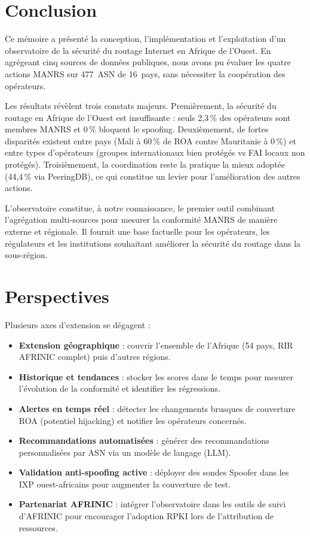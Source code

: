 \documentclass{eneam}
\begin{document}
\section{Conclusion}

Ce mémoire a présenté la conception, l'implémentation et l'exploitation d'un observatoire de la sécurité du routage Internet en Afrique de l'Ouest. En agrégeant cinq sources de données publiques, nous avons pu évaluer les quatre actions MANRS sur 477~ASN de 16~pays, sans nécessiter la coopération des opérateurs.

Les résultats révèlent trois constats majeurs. Premièrement, la sécurité du routage en Afrique de l'Ouest est insuffisante : seuls 2,3\,\% des opérateurs sont membres MANRS et 0\,\% bloquent le spoofing. Deuxièmement, de fortes disparités existent entre pays (Mali à 60\,\% de ROA contre Mauritanie à 0\,\%) et entre types d'opérateurs (groupes internationaux bien protégés vs FAI locaux non protégés). Troisièmement, la coordination reste la pratique la mieux adoptée (44,4\,\% via PeeringDB), ce qui constitue un levier pour l'amélioration des autres actions.

L'observatoire constitue, à notre connaissance, le premier outil combinant l'agrégation multi-sources pour mesurer la conformité MANRS de manière externe et régionale. Il fournit une base factuelle pour les opérateurs, les régulateurs et les institutions souhaitant améliorer la sécurité du routage dans la sous-région.

\section{Perspectives}

Plusieurs axes d'extension se dégagent :

\begin{itemize}
    \item \textbf{Extension géographique} : couvrir l'ensemble de l'Afrique (54 pays, RIR AFRINIC complet) puis d'autres régions.
    \item \textbf{Historique et tendances} : stocker les scores dans le temps pour mesurer l'évolution de la conformité et identifier les régressions.
    \item \textbf{Alertes en temps réel} : détecter les changements brusques de couverture ROA (potentiel hijacking) et notifier les opérateurs concernés.
    \item \textbf{Recommandations automatisées} : générer des recommandations personnalisées par ASN via un modèle de langage (LLM).
    \item \textbf{Validation anti-spoofing active} : déployer des sondes Spoofer dans les IXP ouest-africains pour augmenter la couverture de test.
    \item \textbf{Partenariat AFRINIC} : intégrer l'observatoire dans les outils de suivi d'AFRINIC pour encourager l'adoption RPKI lors de l'attribution de ressources.
\end{itemize}


\backmatter

\nocite{*}
\printbibliography[heading=bibintoc,title={Bibliographie}]

\tableofcontents
\end{document}
